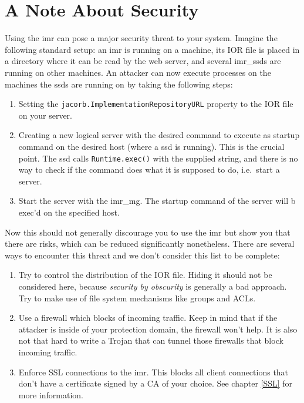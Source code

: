 \documentclass[12pt]{scrbook}
\begin{document}
\section{A Note About Security}
Using the imr can pose a major security threat to your system. Imagine
the following standard setup: an imr  is running on a machine, its IOR
file is placed in a directory where  it can be read by the web server,
and several  imr\_ssds are running  on other machines. An  attacker can
now  execute processes  on the  machines the  ssds are  running  on by
taking the following steps:
\begin{enumerate}
         \item  Setting  the  {\tt  jacorb.ImplementationRepositoryURL}
         property to the IOR file on your server.
         \item  Creating a new logical server with the desired command
           to execute as startup command on the desired host (where a
           ssd is running). This is the crucial point. The ssd calls
           {\tt Runtime.exec()} with the supplied string, and there
           is no way to check if the command does what it is supposed
           to do, i.e.~start a server.
         \item Start the server with the imr\_mg. The startup command
           of the server will b exec'd on the specified host.
\end{enumerate}

Now this should  not generally discourage you to use  the imr but show
you  that   there  are  risks,  which  can   be  reduced  significantly
nonetheless. There  are several ways  to encounter this threat  and we
don't consider this list to be complete:
\begin{enumerate}
        \item Try to control the distribution of the IOR file. Hiding
          it should not be considered here, because {\it security by
            obscurity} is generally a bad approach. Try to make use of
          file system mechanisms like groups and ACLs.
          \item Use a firewall which blocks of incoming traffic. Keep
            in mind that if the attacker is inside of your protection
            domain, the firewall won't help. It is also not that hard
            to write a Trojan that can tunnel those firewalls that
            block incoming traffic.
          \item Enforce SSL connections to the imr. This blocks all
            client connections that don't have a certificate signed by
            a CA of your choice. See chapter \ref{SSL} for more
            information.
\end{enumerate}
\end{document}
